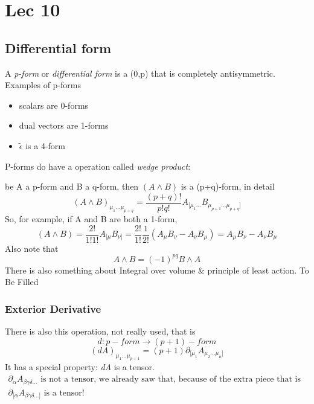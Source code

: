 \section{Lec 10}
\subsection{Differential form}
A \emph{p-form} or \emph{differential form} is a (0,p) that is completely antisymmetric.
Examples of p-forms
\begin{itemize}
	\item scalars are 0-forms
	\item dual vectors are 1-forms
	\item $\tilde{\epsilon }$ is a 4-form
\end{itemize}
P-forms do have a operation called \emph{wedge product}:\par
be A a p-form and B a q-form, then $\left( A \wedge B \right)$ is a (p+q)-form, in detail
\[
	\left( A \wedge B \right)_{\mu _{1}\ldots \mu _{p+q}} = \frac{\left( p+q \right)!}{p!q!} A_{[\mu _{1}\ldots }B_{\mu _{p+1}\ldots \mu _{p+q}]}
\]
So, for example, if A and B are both a 1-form,
\[
	\left( A \wedge B \right) = \frac{2!}{1!1!} A_{[\mu }B_{\nu ]} = \frac{2!}{1!} \frac{1}{2!} \left( A_{\mu }B_{\nu }-A_{\nu }B_{\mu } \right) = A_{\mu }B_{\nu }-A_{\nu }B_{\mu }	
\]
Also note that
\[
A\wedge B = \left( -1 \right)^{pq} B\wedge A	
\]
There is also something about Integral over volume \& principle of least action. To Be Filled

\subsubsection{Exterior Derivative}
There is also this operation, not really used, that is
\[
d : p-form \to \left( p+1 \right)-form
\]
\[
	\left( dA \right)_{\mu _{1}\ldots \mu _{p+1} } = \left( p+1 \right) \partial_{[\mu _{1}}A_{\mu _{2}\ldots \mu _{n}]}
\]
It has a special property: \emph{dA} is a tensor.
\begin{gather}
\partial_{\alpha }A_{\beta  \gamma  \delta \ldots } \text{ is not a tensor, we already saw that, because of the extra piece that is symmetric and become 0 by anti-symmetrization }\\
\partial_{[\alpha }A_{\beta  \gamma  \delta  \ldots ]} \text{ is a tensor! }
\end{gather}

